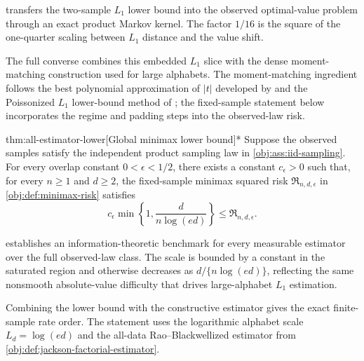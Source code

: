  transfers the two-sample \(L_1\) lower bound into the observed optimal-value problem through an exact product Markov kernel. The factor \(1/16\) is the square of the one-quarter scaling between \(L_1\) distance and the value shift.

The full converse combines this embedded \(L_1\) slice with the dense moment-matching construction used for large alphabets. The moment-matching ingredient follows the best polynomial approximation of \(|t|\) developed by \citet{CaiLow2011L1} and the Poissonized \(L_1\) lower-bound method of \citet{JiaoHanWeissman2018L1}; the fixed-sample statement below incorporates the regime and padding steps into the observed-law risk.

\begin{theoremv}{thm:all-estimator-lower}[Global minimax lower bound]*
Suppose the observed samples satisfy the independent product sampling law in \cref{obj:ass:iid-sampling}. For every overlap constant \(0<\epsilon<1/2\), there exists a constant \(c_\epsilon>0\) such that, for every \(n\geq 1\) and \(d\geq 2\), the fixed-sample minimax squared risk \(\mathfrak R_{n,d,\epsilon}\) in \cref{obj:def:minimax-risk} satisfies
\[
c_\epsilon \min\left\{1,\frac{d}{n\log(ed)}\right\}
\leq
\mathfrak R_{n,d,\epsilon}.
\]
\end{theoremv}

 establishes an information-theoretic benchmark for every measurable estimator over the full observed-law class. The scale is bounded by a constant in the saturated region and otherwise decreases as \(d/\{n\log(ed)\}\), reflecting the same nonsmooth absolute-value difficulty that drives large-alphabet \(L_1\) estimation.

Combining the lower bound with the constructive estimator gives the exact finite-sample rate order. The statement uses the logarithmic alphabet scale \(L_d=\log(ed)\) and the all-data Rao--Blackwellized estimator from \cref{obj:def:jackson-factorial-estimator}.

